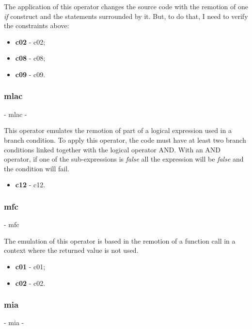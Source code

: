 	The application of this operator changes the source code with the remotion of one \textit{if} construct and the statements surrounded by it.
	But, to do that, I need to verify the constraints above:
	\begin{itemize}
		\item \textbf{\acs{c02}} - \Acl{c02};
		\item \textbf{\acs{c08}} - \Acl{c08};
		\item \textbf{\acs{c09}} - \Acl{c09}.
	\end{itemize}

	\hypertarget{mlac}{}
	\subsubsection{\textbf{\acs{mlac}}} - \Acl{mlac} - 

	This operator emulates the remotion of part of a logical expression used in a branch condition. To apply this operator, the code must have at least two branch conditions linked together with the logical operator AND. With an AND operator, if one of the sub-expressions is \textit{false} all the expression will be \textit{false} and the condition will fail.
	\begin{itemize}
		\item \textbf{\acs{c12}} - \Acl{c12}.
	\end{itemize}

	\hypertarget{mfc}{}
	\subsubsection{\textbf{\acs{mfc}}} - \Acl{mfc}

	The emulation of this operator is based in the remotion of a function call in a context where the returned value is not used.
	\begin{itemize}
		\item \textbf{\acs{c01}} - \Acl{c01};
		\item \textbf{\acs{c02}} - \Acl{c02}.
	\end{itemize}

	\hypertarget{mia}{}
	\subsubsection{\textbf{\acs{mia}}} - \Acl{mia} - 

